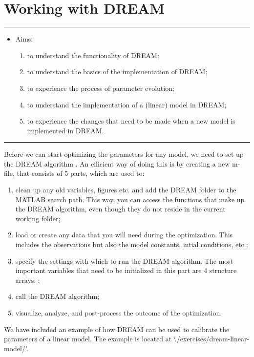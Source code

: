 \chapter{Working with DREAM}
\thispagestyle{fancy}
\label{ch:Working-with-DREAM}


\hrule
\begin{itemize}
\footnotesize
\item[]{Aims:}
\begin{enumerate}
\item{to understand the functionality of DREAM;}
\item{to understand the basics of the implementation of DREAM;}
\item{to experience the process of parameter evolution;}
\item{to understand the implementation of a (linear) model in DREAM;}
\item{to experience the changes that need to be made when a new model is implemented in DREAM.}
\end{enumerate}
\end{itemize}
\hrule
\vspace{1em}

Before we can start optimizing the parameters for any model, we need to set up
the DREAM algorithm \citep{vrug-terb-diks-robi-hyma-higd2009}. An efficient way
of doing this is by creating a new m-file, that consists of 5 parts, which are
used to:
\begin{enumerate}
\item{clean up any old variables, figures etc. and add the DREAM folder to the
MATLAB search path. This way, you can access the functions that make up the
DREAM algorithm, even though they do not reside in the current working folder;}
\item{load or create any data that you will need during the optimization. This
includes the observations but also the model constants, intial conditions,
etc.;}
\item{specify the settings with which to run the DREAM algorithm. The most
important variables that need to be initialized in this part are 4 structure
arrays: ;}
\item{call the DREAM algorithm;}
\item{visualize, analyze, and post-process the outcome of the optimization.}
\end{enumerate}


We have included an example of how DREAM can be used to calibrate the parameters
of a linear model. The example is located at `./exercises/dream-linear-model/'. 


